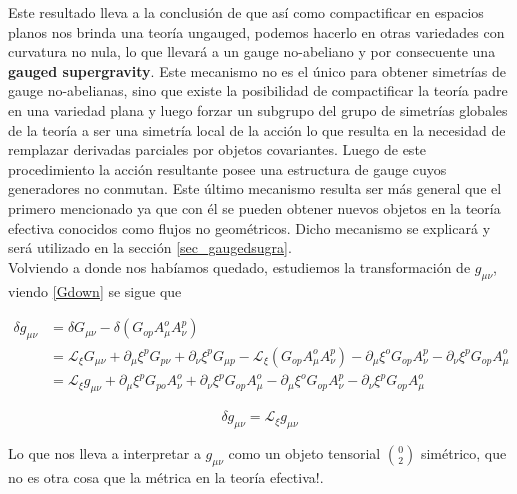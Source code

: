 \documentclass{article}
\numberwithin{equation}{section}
\begin{document}
Este resultado lleva a la conclusión de que así como compactificar en espacios planos nos brinda una teoría ungauged, podemos hacerlo en otras variedades con curvatura no nula, lo que llevará a un gauge no-abeliano y por consecuente una \textbf{gauged supergravity}. Este mecanismo no es el único para obtener simetrías de gauge no-abelianas, sino que existe la posibilidad de compactificar la teoría padre en una variedad plana y luego forzar un subgrupo del grupo de simetrías globales de la teoría a ser una simetría local de la acción lo que resulta en la necesidad de remplazar derivadas parciales por objetos covariantes. Luego de este procedimiento la acción resultante posee una estructura de gauge cuyos generadores no conmutan. Este último mecanismo resulta ser más general que el primero mencionado ya que con él se pueden obtener nuevos objetos en la teoría efectiva conocidos como flujos no geométricos. Dicho mecanismo se explicará y será utilizado en la sección \ref{sec_gaugedsugra}.\\ 

Volviendo a donde nos habíamos quedado, estudiemos la transformación de $ g_{\mu \nu} $, viendo \ref{Gdown} se sigue que

\begin{equation}
\begin{aligned}
\delta g_{\mu \nu} &= \delta G_{\mu \nu} - \delta \left( G_{o p} A^o_\mu A^p_{\nu} \right)\\
&= \mathcal{L}_{\xi} G_{\mu \nu} + \partial_{\mu} \xi^p G_{p \nu} + \partial_{\nu} \xi^p G_{\mu p} - \mathcal{L}_{\xi} \left( G_{o p} A^o_{\mu} A^p_{\nu}\right) -  \partial_{\mu} \xi^o G_{o p} A^p_{\nu} - \partial_{\nu} \xi^p G_{o p}A^o_{\mu}\\
&= \mathcal{L}_{\xi} g_{\mu \nu} + \partial_{\mu} \xi^p G_{p o} A^o_{\nu} + \partial_{\nu} \xi^p G_{o p} A^o_\mu -  \partial_{\mu} \xi^o G_{o p} A^p_{\nu} - \partial_{\nu} \xi^p G_{o p}A^o_{\mu}
\end{aligned}
\end{equation}

\begin{boxquation}\label{g}
	\begin{equation}
	\delta g_{\mu \nu}= \mathcal{L}_{\xi} g_{\mu \nu}
	\end{equation}
\end{boxquation}

Lo que nos lleva a interpretar a $ g_{\mu \nu} $ como un objeto tensorial $ \binom{0}{2} $ simétrico, que no es otra cosa que la métrica en la teoría efectiva!.
\end{document}
